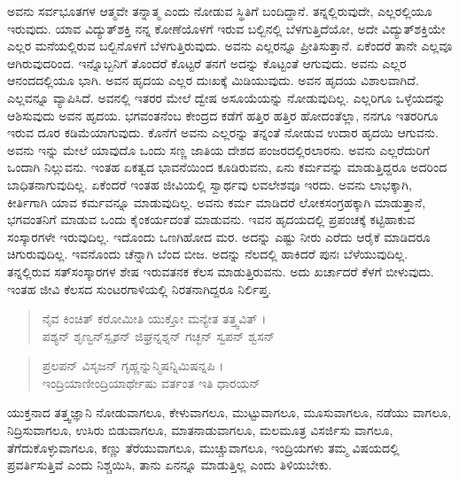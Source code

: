 ಅವನು ಸರ್ವಭೂತಗಳ ಆತ್ಮವೇ ತನ್ನಾತ್ಮ ಎಂದು ನೋಡುವ ಸ್ಥಿತಿಗೆ ಬಂದಿದ್ದಾನೆ. ತನ್ನಲ್ಲಿರುವುದೇ, ಎಲ್ಲರಲ್ಲಿಯೂ ಇರುವುದು. ಯಾವ ವಿದ್ಯುತ್​ಶಕ್ತಿ ನನ್ನ ಕೋಣೆಯೊಳಗೆ ಇರುವ ಬಲ್ಬಿನಲ್ಲಿ ಬೆಳಗುತ್ತಿದೆಯೋ, ಅದೇ ವಿದ್ಯುತ್​ಶಕ್ತಿಯೇ ಎಲ್ಲರ ಮನೆಯಲ್ಲಿರುವ ಬಲ್ಬಿನೊಳಗೆ ಬೆಳಗುತ್ತಿರುವುದು. ಅವನು ಎಲ್ಲರನ್ನೂ ಪ್ರೀತಿಸುತ್ತಾನೆ. ಏಕೆಂದರೆ ತಾನೇ ಎಲ್ಲವೂ ಆಗಿರುವುದರಿಂದ. ಇನ್ನೊಬ್ಬನಿಗೆ ತೊಂದರೆ ಕೊಟ್ಟರೆ ತನಗೆ ಅದನ್ನು ಕೊಟ್ಟಂತೆ ಆಗುವುದು. ಅವನು ಎಲ್ಲರ ಆನಂದದಲ್ಲಿಯೂ ಭಾಗಿ. ಅವನ ಹೃದಯ ಎಲ್ಲರ ದುಃಖಕ್ಕೆ ಮಿಡಿಯುವುದು. ಅವನ ಹೃದಯ ವಿಶಾಲವಾಗಿದೆ. ಎಲ್ಲವನ್ನೂ ವ್ಯಾಪಿಸಿದೆ. ಅವನಲ್ಲಿ ಇತರರ ಮೇಲೆ ದ್ವೇಷ ಅಸೂಯೆಯನ್ನು ನೋಡುವುದಿಲ್ಲ. ಎಲ್ಲರಿಗೂ ಒಳ್ಳೆಯದನ್ನು ಆಶಿಸುವುದು ಅವನ ಹೃದಯ. ಭಗವಂತನೆಂಬ ಕೇಂದ್ರದ ಕಡೆಗೆ ಹತ್ತಿರ ಹತ್ತಿರ ಹೋದಂತೆಲ್ಲಾ, ನನಗೂ ಇತರರಿಗೂ ಇರುವ ದೂರ ಕಡಿಮೆಯಾಗುವುದು. ಕೊನೆಗೆ ಅವನು ಎಲ್ಲರನ್ನು ತನ್ನಂತೆ ನೋಡುವ ಉದಾರ ಹೃದಯಿ ಆಗುವನು. ಅವನು ಇನ್ನು ಮೇಲೆ ಯಾವುದೊ ಒಂದು ಸಣ್ಣ ಜಾತಿಯ ದೇಶದ ಪಂಜರದಲ್ಲಿರಲಾರನು. ಅವನು ಎಲ್ಲರೆದುರಿಗೆ ಒಂದಾಗಿ ನಿಲ್ಲುವನು. ಇಂತಹ ಏಕತ್ವದ ಭಾವನೆಯಿಂದ ಕೂಡಿರುವನು, ಏನು ಕರ್ಮವನ್ನು ಮಾಡುತ್ತಿದ್ದರೂ ಅದರಿಂದ ಬಾಧಿತನಾಗುವುದಿಲ್ಲ. ಏಕೆಂದರೆ ಇಂತಹ ಜೀವಿಯಲ್ಲಿ ಸ್ವಾರ್ಥವು ಲವಲೇಶವೂ ಇರದು. ಅವನು ಲಾಭಕ್ಕಾಗಿ, ಕೀರ್ತಿಗಾಗಿ ಯಾವ ಕರ್ಮವನ್ನೂ ಮಾಡುವುದಿಲ್ಲ. ಅವನು ಕರ್ಮ ಮಾಡಿದರೆ ಲೋಕಸಂಗ್ರಹಕ್ಕಾಗಿ ಮಾಡುತ್ತಾನೆ, ಭಗವಂತನಿಗೆ ಮಾಡುವ ಒಂದು ಕೈಂಕರ್ಯದಂತೆ ಮಾಡುವನು. ಇವನ ಹೃದಯದಲ್ಲಿ ಪ್ರಪಂಚಕ್ಕೆ ಕಟ್ಟಿಹಾಕುವ ಸಂಸ್ಕಾರಗಳೇ ಇರುವುದಿಲ್ಲ. ಇದೊಂದು ಒಣಗಿಹೋದ ಮರ. ಅದನ್ನು ಎಷ್ಟು ನೀರು ಎರೆದು ಆರೈಕೆ ಮಾಡಿದರೂ ಚಿಗುರುವುದಿಲ್ಲ. ಇವನೊಂದು ಚೆನ್ನಾಗಿ ಬೆಂದ ಬೀಜ. ಅದನ್ನು ನೆಲದಲ್ಲಿ ಹಾಕಿದರೆ ಪುನಃ ಬೆಳೆಯುವುದಿಲ್ಲ. ತನ್ನಲ್ಲಿರುವ ಸತ್​ಸಂಸ್ಕಾರಗಳ ಶೇಷ ಇರುವತನಕ ಕೆಲಸ ಮಾಡುತ್ತಿರುವನು. ಅದು ಖರ್ಚಾದರೆ ಕೆಳಗೆ ಬೀಳುವುದು. ಇಂತಹ ಜೀವಿ ಕೆಲಸದ ಸುಂಟರಗಾಳಿಯಲ್ಲಿ ನಿರತನಾಗಿದ್ದರೂ ನಿರ್ಲಿಪ್ತ.

\begin{verse}
ನೈವ ಕಿಂಚಿತ್ ಕರೋಮೀತಿ ಯುಕ್ತೋ ಮನ್ಯೇತ ತತ್ತ್ವವಿತ್ ।\\ಪಶ್ಯನ್ ಶೃಣ್ವನ್​ಸ್ಪೃಶನ್ ಜಿಘ್ರನ್ನಶ್ನನ್ ಗಚ್ಛನ್ ಸ್ವಪನ್ ಶ್ವಸನ್ 
\end{verse}

\begin{verse}
ಪ್ರಲಪನ್ ವಿಸೃಜನ್ ಗೃಹ್ಣನ್ನುನ್ಮಿಷನ್ನಿಮಿಷನ್ನಪಿ ।\\ಇಂದ್ರಿಯಾಣೀಂದ್ರಿಯಾರ್ಥೇಷು ವರ್ತಂತ ಇತಿ ಧಾರಯನ್ 
\end{verse}

{\small ಯುಕ್ತನಾದ ತತ್ತ್ವಜ್ಞಾನಿ ನೋಡುವಾಗಲೂ, ಕೇಳುವಾಗಲೂ, ಮುಟ್ಟುವಾಗಲೂ, ಮೂಸುವಾಗಲೂ, ನಡೆಯು ವಾಗಲೂ, ನಿದ್ರಿಸುವಾಗಲೂ, ಉಸಿರು ಬಿಡುವಾಗಲೂ, ಮಾತನಾಡುವಾಗಲೂ, ಮಲಮೂತ್ರ ವಿಸರ್ಜಿಸು ವಾಗಲೂ, ತೆಗೆದುಕೊಳ್ಳುವಾಗಲೂ, ಕಣ್ಣು ತೆರೆಯುವಾಗಲೂ, ಮುಚ್ಚುವಾಗಲೂ, ಇಂದ್ರಿಯಗಳು ತಮ್ಮ ವಿಷಯದಲ್ಲಿ ಪ್ರವರ್ತಿಸುತ್ತಿವೆ ಎಂದು ನಿಶ್ಚಯಿಸಿ, ತಾನು ಏನನ್ನೂ ಮಾಡುತ್ತಿಲ್ಲ ಎಂದು ತಿಳಿಯಬೇಕು.}

